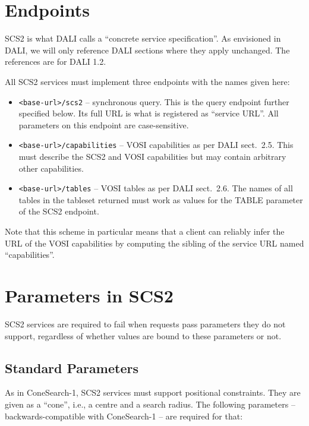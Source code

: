 \documentclass[11pt,a4paper]{ivoa}
\begin{document}
\section{Endpoints}

SCS2 is what DALI \citep{2017ivoa.spec.0517D} calls a ``concrete service
specification''.  As envisioned in DALI, we will only reference DALI
sections where they apply unchanged.  The references are for DALI 1.2.

All SCS2 services must implement three endpoints with the names given
here:

\begin{itemize}
\item \verb|<base-url>/scs2| -- synchronous query.  This is the query
endpoint further specified below.  Its full URL is what is registered as
``service URL''.  All parameters on this endpoint are case-sensitive.

\item \verb|<base-url>/capabilities| -- VOSI capabilities as per DALI
sect.~2.5.  This must describe the SCS2 and VOSI capabilities but may
contain arbitrary other capabilities.

\item \verb|<base-url>/tables| -- VOSI tables as per DALI sect.~2.6.
The names of all tables in the tableset returned must work as values for
the TABLE parameter of the SCS2 endpoint.
\end{itemize}

Note that this scheme in particular means that a client can reliably
infer the URL of the VOSI capabilities by computing the sibling of the
service URL named ``capabilities''.

\section{Parameters in SCS2}

SCS2 services are required to fail when requests pass parameters they do
not support, regardless of whether values are bound to these parameters
or not.

\subsection{Standard Parameters}

As in ConeSearch-1, SCS2 services must support positional constraints.  They are
given as a ``cone'', i.e., a centre and a search radius.  The following
parameters -- backwards-compatible with ConeSearch-1 -- are required for that:
\end{document}

